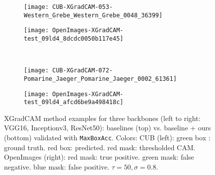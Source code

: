 \documentclass[twocolumn]{article}
\newcommand\maxboxacc{\texttt{MaxBoxAcc}\xspace}
\theoremstyle{definition}
\begin{document}
\begin{figure*}
\begin{subfigure}[b]{0.49\textwidth}
         \centering
         \texttt{[image: CUB-XGradCAM-053-Western\_Grebe\_Western\_Grebe\_0048\_36399]}
     \end{subfigure}
     \hfill
     \begin{subfigure}[b]{0.49\textwidth}
         \centering
         \texttt{[image: OpenImages-XGradCAM-test\_09ld4\_8dcdc0050b117e45]}
     \end{subfigure}
     \\
     \vspace{0.1cm}
     \begin{subfigure}[b]{0.49\textwidth}
         \centering
         \texttt{[image: CUB-XGradCAM-072-Pomarine\_Jaeger\_Pomarine\_Jaeger\_0002\_61361]}
     \end{subfigure}
     \hfill
     \begin{subfigure}[b]{0.49\textwidth}
         \centering
         \texttt{[image: OpenImages-XGradCAM-test\_09ld4\_afcd6be9a498418c]}
     \end{subfigure}
        \caption{XGradCAM method examples for three backbones (left to right: VGG16, Inceptionv3, ResNet50): baselines (top) vs. baseline + ours (bottom)  validated with \maxboxacc. Colors: CUB (left): green box : ground truth. red box: predicted. red mask: thresholded CAM. OpenImages (right): red mask: true positive. green mask: false negative. blue mask: false positive. ${\tau=50, \sigma=0.8}$.}
        \label{fig:xgradcam-cub-openim-example-pred}
\end{figure*}


\FloatBarrier
\clearpage
\newpage




\end{document}
